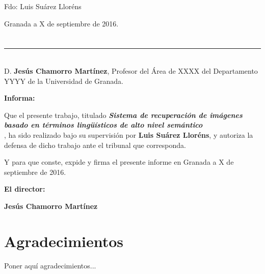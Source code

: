 \vspace{6cm}

\noindent Fdo: Luis Suárez Lloréns

\vspace{2cm}

\begin{flushright}
Granada a X de septiembre de 2016.
\end{flushright}


\chapter*{}
\thispagestyle{empty}

\noindent\rule[-1ex]{\textwidth}{2pt}\\[4.5ex]

D. \textbf{Jesús Chamorro Martínez}, Profesor del Área de XXXX del Departamento YYYY de la Universidad de Granada.

\vspace{0.5cm}

\textbf{Informa:}

\vspace{0.5cm}

Que el presente trabajo, titulado \textit{\textbf{Sistema de recuperación de imágenes basado en
términos lingüísticos de alto nivel semántico
\\}},
ha sido realizado bajo su supervisión por \textbf{Luis Suárez Lloréns}, y autoriza la defensa de dicho trabajo ante el tribunal
que corresponda.

\vspace{0.5cm}

Y para que conste, expide y firma el presente informe en Granada a X de septiembre de 2016.

\vspace{1cm}

\textbf{El director:}

\vspace{5cm}

\noindent \textbf{Jesús Chamorro Martínez}

\chapter*{Agradecimientos}
\thispagestyle{empty}

       \vspace{1cm}


Poner aquí agradecimientos...

